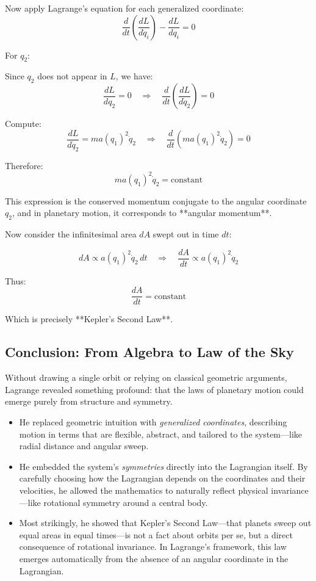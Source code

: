 Now apply Lagrange’s equation for each generalized coordinate:
\[
\frac{d}{dt} \left( \frac{dL}{d\dot{q}_i} \right) - \frac{dL}{dq_i} = 0
\]

For \( q_2 \):

Since \( q_2 \) does not appear in \( L \), we have:
\[
\frac{dL}{dq_2} = 0 \quad \Rightarrow \quad \frac{d}{dt} \left( \frac{dL}{d\dot{q}_2} \right) = 0
\]

Compute:
\[
\frac{dL}{d\dot{q}_2} = m a(q_1)^2 \dot{q}_2
\quad \Rightarrow \quad
\frac{d}{dt} \left( m a(q_1)^2 \dot{q}_2 \right) = 0
\]

Therefore:
\[
m a(q_1)^2 \dot{q}_2 = \text{constant}
\]

This expression is the conserved momentum conjugate to the angular coordinate \( q_2 \), and in planetary motion, it corresponds to **angular momentum**.

Now consider the infinitesimal area \( dA \) swept out in time \( dt \):

\[
dA \propto a(q_1)^2 \dot{q}_2 \, dt \quad \Rightarrow \quad \frac{dA}{dt} \propto a(q_1)^2 \dot{q}_2
\]

Thus:
\[
\frac{dA}{dt} = \text{constant}
\]

Which is precisely **Kepler’s Second Law**.


\subsection{Conclusion: From Algebra to Law of the Sky}

Without drawing a single orbit or relying on classical geometric arguments, Lagrange revealed something profound: that the laws of planetary motion could emerge purely from structure and symmetry.

\begin{itemize}
    \item He replaced geometric intuition with \textit{generalized coordinates}, describing motion in terms that are flexible, abstract, and tailored to the system—like radial distance and angular sweep.
    
    \item He embedded the system’s \textit{symmetries} directly into the Lagrangian itself. By carefully choosing how the Lagrangian depends on the coordinates and their velocities, he allowed the mathematics to naturally reflect physical invariance—like rotational symmetry around a central body.
    
    \item Most strikingly, he showed that Kepler’s Second Law—that planets sweep out equal areas in equal times—is not a fact about orbits per se, but a direct consequence of rotational invariance. In Lagrange's framework, this law emerges automatically from the absence of an angular coordinate in the Lagrangian.
\end{itemize}

